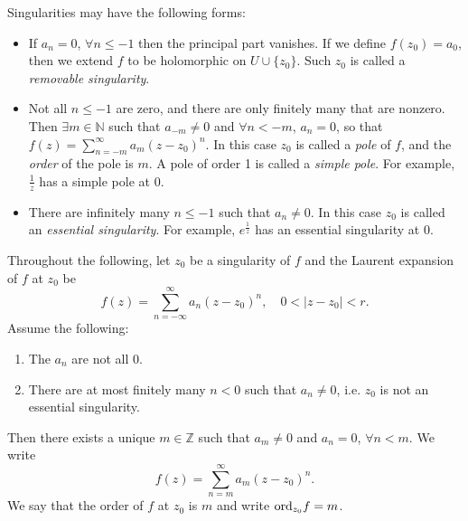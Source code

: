 \begin{defn}
Singularities may have the following forms:
\begin{itemize}
  \item{
    If $a_n = 0$, $\forall n \leq -1$ then the
    principal part vanishes. If we define $f(z_0) = a_0$,
    then we extend $f$ to be holomorphic on
    $U \cup \{ z_0 \}$. Such $z_0$ is called a \emph{removable
    singularity}.
  }
  \item{
    Not all $n \leq -1$ are zero, and there are only
    finitely many that are nonzero. Then
    $\exists m \in \mathbb{N}$ such that $a_{-m} \neq 0$
    and $\forall n < -m$, $a_n = 0$, so that
    $f(z) = \sum_{n=-m}^\infty a_m (z - z_0)^n$. In this case
    $z_0$ is called a \emph{pole} of $f$, and the
    \emph{order} of the pole is $m$. A pole of order 1 is called
    a \emph{simple pole}. For example, $\frac{1}{z}$ has a simple
    pole at $0$.
  }
  \item{
    There are infinitely many $n \leq -1$ such that $a_n \neq 0$.
    In this case $z_0$ is called an \emph{essential singularity}.
    For example, $e^{\frac{1}{z}}$ has an essential singularity at
    $0$.
  }
\end{itemize}

Throughout the following, let $z_0$ be a singularity of $f$ and the
Laurent expansion of $f$ at $z_0$ be
$$
f(z) = \sum_{n=-\infty}^{\infty} a_n (z - z_0)^n, \quad
0 < |z - z_0| < r.
$$
Assume the following:
\begin{enumerate}
  \item{
    The $a_n$ are not all 0.
  }
  \item{
    There are at most finitely many $n < 0$ such that
    $a_n \neq 0$, i.e. $z_0$ is not an essential singularity.
  }
\end{enumerate}
Then there exists a unique $m \in \mathbb{Z}$ such that
$a_m \neq 0$ and $a_n = 0$, $\forall n < m$. We write
$$
f(z) = \sum_{n=m}^{\infty} a_m (z - z_0)^n.
$$
We say that the order of $f$ at $z_0$ is $m$ and write
$\mathrm{ord}_{z_0} f = m$.


\end{defn}
